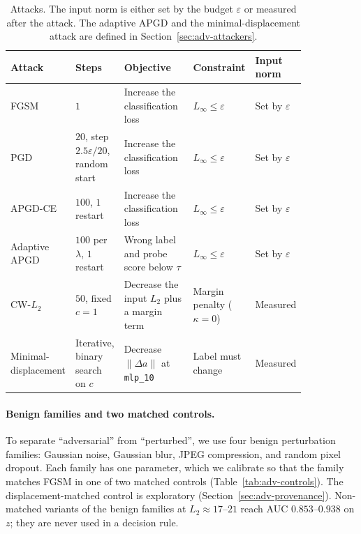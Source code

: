 \documentclass[../ppgc-tese.tex]{subfiles}
\begin{document}
\begin{table}[ht]
  \centering
  \caption{Attacks. The input norm is either set by the budget $\varepsilon$ or
  measured after the attack. The adaptive APGD and the minimal-displacement
  attack are defined in Section~\ref{sec:adv-attackers}.}
  \label{tab:adv-attacks}
  \small
  \begin{tabular}{@{}>{\raggedright\arraybackslash}p{0.18\linewidth}>{\raggedright\arraybackslash}p{0.16\linewidth}>{\raggedright\arraybackslash}p{0.24\linewidth}>{\raggedright\arraybackslash}p{0.15\linewidth}>{\raggedright\arraybackslash}p{0.11\linewidth}@{}}
    \toprule
    Attack & Steps & Objective & Constraint & Input norm \\
    \midrule
    FGSM \cite{goodfellow2015fgsm} & $1$ & Increase the classification loss & $L_\infty\le\varepsilon$ & Set by $\varepsilon$ \\
    PGD \cite{madry2018pgd} & $20$, step $2.5\varepsilon/20$, random start & Increase the classification loss & $L_\infty\le\varepsilon$ & Set by $\varepsilon$ \\
    APGD-CE \cite{croce2020apgd_autoattack} & $100$, $1$ restart & Increase the classification loss & $L_\infty\le\varepsilon$ & Set by $\varepsilon$ \\
    Adaptive APGD & $100$ per $\lambda$, $1$ restart & Wrong label and probe score below $\tau$ & $L_\infty\le\varepsilon$ & Set by $\varepsilon$ \\
    CW-$L_2$ \cite{carlini2017cw_attack} & $50$, fixed $c{=}1$ & Decrease the input $L_2$ plus a margin term & Margin penalty ($\kappa{=}0$) & Measured \\
    Minimal-displacement & Iterative, binary search on $c$ & Decrease $\lVert\Delta a\rVert$ at \texttt{mlp\_10} & Label must change & Measured \\
    \bottomrule
  \end{tabular}
\end{table}

\paragraph*{Benign families and two matched controls.}
To separate ``adversarial'' from ``perturbed'', we use four benign perturbation
families: Gaussian noise, Gaussian blur, JPEG compression, and random pixel
dropout. Each family has one parameter, which we calibrate so that the family
matches FGSM in one of two matched controls (Table~\ref{tab:adv-controls}).
The displacement-matched control is exploratory
(Section~\ref{sec:adv-provenance}). Non-matched variants of the benign
families at $L_2\approx17$--$21$ reach AUC $0.853$--$0.938$ on $z$; they are
never used in a decision rule.
\end{document}
